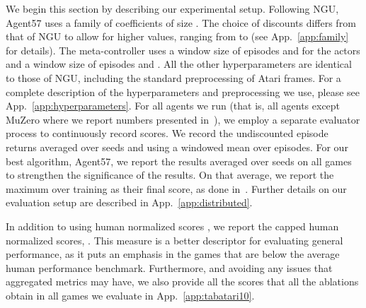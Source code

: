 \documentclass{article}
\begin{document}
We begin this section by describing our experimental setup. Following NGU, Agent57 uses a family of coefficients  of size . The choice of discounts  differs from that of NGU to allow for higher values, ranging from  to  (see App.~\ref{app:family} for details). The meta-controller uses a window size of  episodes and  for the actors and a window size of  episodes and . All the other hyperparameters are identical to those of NGU, including the standard preprocessing of Atari frames. For a complete description of the hyperparameters and preprocessing we use, please see App.~\ref{app:hyperparameters}. For all agents we run (that is, all agents except MuZero where we report numbers presented in~\citet{schrittwieser2019mastering}), we employ a separate evaluator process to continuously record scores. We record the undiscounted episode returns averaged over  seeds and using a windowed mean over  episodes. For our best algorithm, Agent57, we report the results averaged over  seeds on all games to strengthen the significance of the results. On that average, we report the maximum over training as their final score, as done in~\citet{fortunato2017noisy, badia2020never}. Further details on our evaluation setup are described in App.~\ref{app:distributed}.

In addition to using human normalized scores , we report the capped human normalized scores, .
This measure is a better descriptor for evaluating general performance, as it puts an emphasis in the games that are below the average human performance benchmark. Furthermore, and avoiding any issues that aggregated metrics may have, we also provide all the scores that all the ablations obtain in all games we evaluate in App.~\ref{app:tabatari10}.
\end{document}
